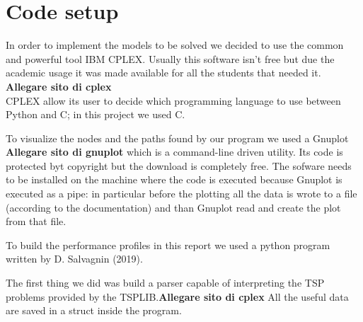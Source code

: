 \section{Code setup}
In order to implement the models to be solved we decided to use the common and powerful tool IBM CPLEX. Usually this software isn't free but due the academic usage it was made available for all the students that needed it. \textbf{Allegare sito di cplex}\\
CPLEX allow its user to decide which programming language to use between Python and C; in this project we used C.

To visualize the nodes and the paths found by our program we used a Gnuplot \textbf{Allegare sito di gnuplot} which is a command-line driven utility. Its code is protected byt copyright but the download is completely free. The sofware needs to be installed on the machine where the code is executed because Gnuplot is executed as a pipe: in particular before the plotting all the data is wrote to a file (according to the documentation) and than Gnuplot read and create the plot from that file.

To build the performance profiles in this report we used a python program written by D. Salvagnin (2019).


The first thing we did was build a parser capable of interpreting the TSP problems provided by the TSPLIB.\textbf{Allegare sito di cplex} All the useful data are saved in a struct inside the program.